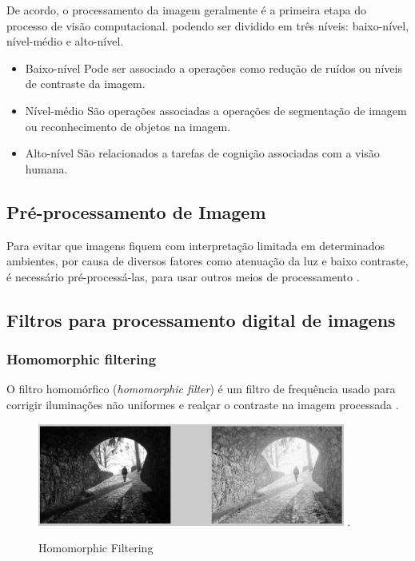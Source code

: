 De acordo, o processamento da imagem geralmente é a primeira etapa do processo de visão computacional.
podendo ser dividido em três níveis: baixo-nível, nível-médio e alto-nível.
\begin{itemize}
\item Baixo-nível
	Pode ser associado a operações como redução de ruídos ou níveis de contraste da imagem.
\item Nível-médio
	São operações associadas a operações de segmentação de imagem ou reconhecimento de objetos na imagem.
\item Alto-nível
	São relacionados a tarefas de cognição associadas com a visão humana.
\end{itemize} 

\subsection{Pré-processamento de Imagem} \label{sect:preprocs}
Para evitar que imagens fiquem com interpretação limitada em determinados ambientes, por causa de diversos fatores como atenuação da luz e baixo contraste, é necessário pré-processá-las, para usar outros meios de processamento \cite{bazeille2006}. 

\subsection{Filtros para processamento digital de imagens}
\subsubsection{Homomorphic filtering} 
	O filtro homomórfico (\textit{homomorphic filter}) é um filtro de frequência usado para corrigir iluminações não uniformes e realçar o contraste na imagem processada \cite{bazeille2006}.
     
 \begin{figure}[H]
	\centering
    	\caption{\label{fig:homofilter}Homomorphic Filtering}
		\includegraphics[width = 0.9\textwidth]	{resources/homofilter}
    	.
\end{figure}

